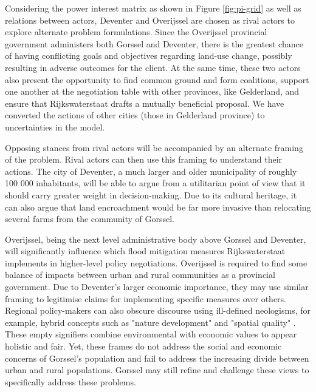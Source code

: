 \bigskip 
Considering the power interest matrix as shown in Figure \ref{fig:pi-grid} as well as relations between actors, Deventer and Overijssel are chosen as rival actors to explore alternate problem formulations. Since the Overijssel provincial government administers both Gorssel and Deventer, there is the greatest chance of having conflicting goals and objectives regarding land-use change, possibly resulting in adverse outcomes for the client. At the same time, these two actors also present the opportunity to find common ground and form coalitions, support one another at the negotiation table with other provinces, like Gelderland, and ensure that Rijkswaterstaat drafts a mutually beneficial proposal. We have converted the actions of other cities (those in Gelderland province) to uncertainties in the model.

\bigskip 

Opposing stances from rival actors will be accompanied by an alternate framing of the problem. Rival actors can then use this framing to understand their actions. The city of Deventer, a much larger and older municipality of roughly 100 000 inhabitants, will be able to argue from a utilitarian point of view that it should carry greater weight in decision-making. Due to its cultural heritage, it can also argue that land encroachment would be far more invasive than relocating several farms from the community of Gorssel. 

Overijssel, being the next level administrative body above Gorssel and Deventer, will significantly influence which flood mitigation measures Rijkswaterstaat implements in higher-level policy negotiations. Overijssel is required to find some balance of impacts between urban and rural communities as a provincial government. Due to Deventer's larger economic importance, they may use similar framing to legitimise claims for implementing specific measures over others. Regional policy-makers can also obscure discourse using ill-defined neologisms, for example, hybrid concepts such as "nature development" and "spatial quality" \parencite{warner_implementing_2011}. These empty signifiers combine environmental with economic values to appear holistic and fair. Yet, these frames do not address the social and economic concerns of Gorssel's population and fail to address the increasing divide between urban and rural populations. Gorssel may still refine and challenge these views to specifically address these problems.

